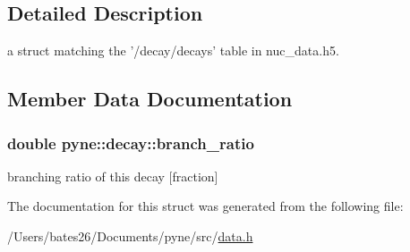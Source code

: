 \subsection{Detailed Description}
a struct matching the '/decay/decays' table in nuc\+\_\+data.\+h5. 

\subsection{Member Data Documentation}
\hypertarget{structpyne_1_1decay_a21a58630e6aac8aa5517fb9d1bafe5d6}{
\subsubsection[{branch\+\_\+ratio}]{\setlength{\rightskip}{0pt plus 5cm}double pyne\+::decay\+::branch\+\_\+ratio}}\label{structpyne_1_1decay_a21a58630e6aac8aa5517fb9d1bafe5d6}
branching ratio of this decay \mbox{[}fraction\mbox{]} 

The documentation for this struct was generated from the following file\+:\begin{DoxyCompactItemize}
\item 
/\+Users/bates26/\+Documents/pyne/src/\hyperlink{data_8h}{data.\+h}\end{DoxyCompactItemize}
